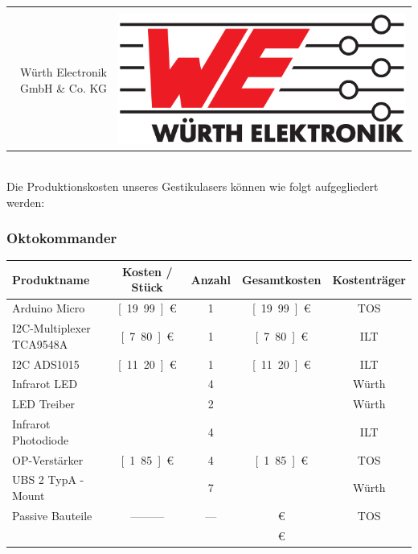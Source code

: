 \begin{tabularx}{\textwidth}{r c}
	\vspace{1.5cm} & \\
	Würth Electronik GmbH \& Co. KG & \noindent\parbox[c]{\hsize}{\includegraphics[scale=0.05]{../Logos/Wuerth.png}}
\end{tabularx} \\

\newpage
\noindent
Die Produktionskosten unseres Gestikulasers können wie folgt aufgegliedert werden:

\subsubsection*{Oktokommander} 
\begin{tabularx}{\textwidth}{p{4.5cm} | c c c c}
	Produktname		 			& Kosten / Stück 	& Anzahl & Gesamtkosten    & Kostenträger \\ 
	\hline
	Arduino Micro 				& \unit[19.99]{€}   &   1    & \unit[19.99]{€} & TOS 	\\ [2mm]
	I2C-Multiplexer TCA9548A	& \unit[7.80]{€}    &   1    & \unit[7.80]{€}  & ILT    \\ [8mm]
	I2C ADS1015					& \unit[11.20]{€}   &   1    & \unit[11.20]{€} & ILT    \\ [2mm]
	Infrarot LED    			&					&   4    &				   & Würth  \\ [2mm]
	LED Treiber     			&                   &   2    &                 & Würth  \\ [2mm]
	Infrarot Photodiode 		&					&   4    &                 & ILT	\\ [8mm] 
	OP-Verstärker    			& \unit[1.85]{€}    &	4    & \unit[1.85]{€}  & TOS    \\ [2mm]
	UBS 2 TypA -Mount			&                   &   7    &                 & Würth  \\ [2mm]
	Passive Bauteile    		&	---------       &  ---   & \unit[1]{€}	   & TOS    \\ [2mm]
	\hline
								&					&		 & \unit[60]{€}	   &
\end{tabularx}\\

